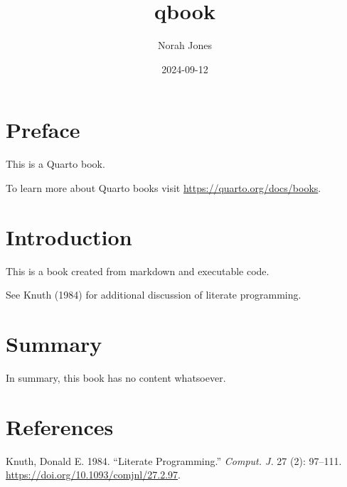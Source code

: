 \documentclass[
  letterpaper,
  DIV=11,
  numbers=noendperiod]{scrreprt}
\title{qbook}
\author{Norah Jones}
\date{2024-09-12}
\newlength{\cslhangindent}
\newenvironment{CSLReferences}[2] %
 {\begin{list}{}{%
  \setlength{\itemindent}{0pt}
  \setlength{\leftmargin}{0pt}
  \setlength{\parsep}{0pt}
  \ifodd #1
   \setlength{\leftmargin}{\cslhangindent}
   \setlength{\itemindent}{-1\cslhangindent}
  \fi
  \setlength{\itemsep}{#2\baselineskip}}}
 {\end{list}}
\renewcommand*\contentsname{Table of contents}
\newcommand\contentsname{Table of contents}
\begin{document}
\maketitle

\renewcommand*\contentsname{Table of contents}
{
\hypersetup{linkcolor=}
\setcounter{tocdepth}{2}
\tableofcontents
}


\chapter*{Preface}\label{preface}


This is a Quarto book.

To learn more about Quarto books visit
\url{https://quarto.org/docs/books}.


\chapter{Introduction}\label{introduction}

This is a book created from markdown and executable code.

See Knuth (1984) for additional discussion of literate programming.


\chapter{Summary}\label{summary}

In summary, this book has no content whatsoever.


\chapter*{References}\label{references}


\label{refs}
\begin{CSLReferences}{1}{0}
Knuth, Donald E. 1984. {``Literate Programming.''} \emph{Comput. J.} 27
(2): 97--111. \url{https://doi.org/10.1093/comjnl/27.2.97}.

\end{CSLReferences}
\end{document}
